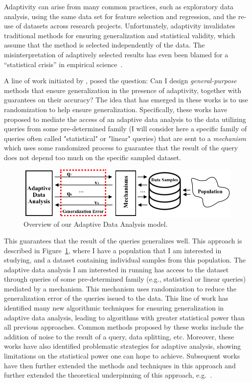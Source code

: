  Adaptivity can arise from many common practices, such as exploratory data analysis, using the same data set for feature selection and regression, and the re-use of datasets across research projects. Unfortunately, adaptivity invalidates traditional methods for ensuring generalization and statistical validity, which assume that the method is selected independently of the data. The misinterpretation of adaptively selected results has even been blamed for a ``statistical crisis'' in empirical science~\cite{GelmanL13}.

A line of work initiated by \cite{DworkFHPRR15}, \cite{HardtU14} posed the question: 
Can I design \emph{general-purpose} methods that ensure generalization in the presence of adaptivity, together with guarantees on their accuracy? 
The idea that has emerged in these works is to use randomization to help ensure generalization. 
Specifically, these works have proposed to mediate the access of an adaptive data analysis to the data utilizing queries from some pre-determined family (I will consider here a specific family of queries often called "statistical" or "linear" queries) that are sent to a 
\emph{mechanism} which uses some randomized process to guarantee that the result of the query does not depend too much on the specific
sampled dataset. 
%
\begin{figure}
 \centering
 \includegraphics[width=0.7\columnwidth]{figures/data_analysis_model.png}
 \caption{Overview of our Adaptive Data Analysis model.}
 \label{fig:adaptivity-model-overview}
\vspace{-0.5cm}
\end{figure}
This guarantees that the result of the queries generalizes well. 
This approach is described in Figure~\ref{fig:adaptivity-model-overview}, where
I have a population that I am interested in studying, and a dataset containing individual samples from this population. The adaptive data analysis I am interested in running has access to the dataset through queries of some pre-determined family (e.g., statistical or linear queries) mediated by a mechanism. 
This mechanism uses randomization to reduce the generalization error of the queries issued to the data.
This line of work has identified many new algorithmic techniques for ensuring generalization in adaptive data analysis, leading to algorithms with greater statistical power than all previous approaches. 
Common methods proposed by these works include the addition of noise to the result of a query, data splitting, etc. 
Moreover, these works have also identified problematic strategies for adaptive analysis, showing limitations on the statistical power one can hope to achieve. 
Subsequent works have then further extended the methods and techniques in this approach and further extended the theoretical underpinning of this approach, 
e.g.~\cite{dwork2015reusable,dwork2015generalization,BassilyNSSSU16,UllmanSNSS18,FeldmanS17,jung2019new,SteinkeZ20,RogersRSSTW20}.
%

